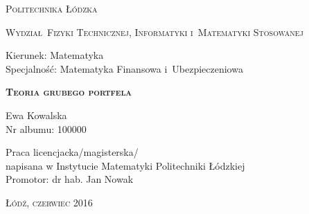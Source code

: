 \documentclass
[a4paper,12pt]{amsart}
\begin{document}
\begin{titlepage}
\begin{flushleft}
\end{flushleft}
\begin{center}
\textsc{{\huge Politechnika \L\'odzka}}
\end{center}
\bigskip
\bigskip
\begin{center}
\textsc{{\Large Wydzia\l\ Fizyki Technicznej, Informatyki i~Matematyki Stosowanej}}
\end{center}
\bigskip
\bigskip
\begin{Large}
Kierunek: Matematyka\\   
Specjalno\'s\'c: Matematyka Finansowa i~Ubezpieczeniowa %

\end{Large}
\bigskip
\bigskip
\bigskip
\bigskip
\noindent\hrulefill
\begin{center}
\textsc{\textbf{{\Large Teoria grubego portfela %
\\}}}
\end{center}
\bigskip
\bigskip
\begin{flushright}
{\large 
Ewa Kowalska %
\\
Nr albumu: 
100000 %
\\}
\end{flushright}
\noindent\hrulefill
\bigskip
\bigskip
\bigskip
\bigskip
\begin{center}
{\large Praca licencjacka/magisterska/\\ %
napisana w Instytucie Matematyki Politechniki \L\'odzkiej\\ 
\bigskip
\bigskip
\bigskip
\bigskip
Promotor: dr hab. Jan Nowak %
 }
\end{center}
\bigskip
\bigskip
\bigskip
\bigskip
\begin{center}
{\textsc{\large \L\'od\'z, czerwiec 2016 %
}}
\end{center}
\end{titlepage}
\end{document}
